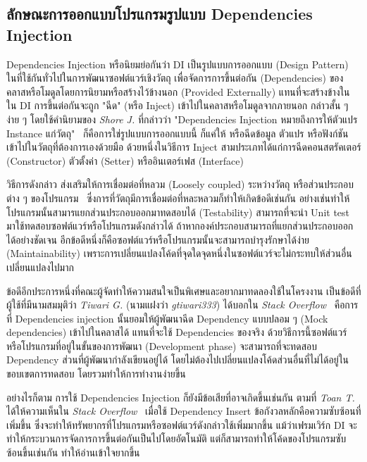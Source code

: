 \documentclass[12pt,one side,openright,a4paper]{cpe-thesis-th}
\newcommand{\thaijustify}[1]{%
  \par\hspace{30pt}\justifying
  #1
}
\begin{document}
\subsection{ลักษณะการออกแบบโปรแกรมรูปแบบ Dependencies Injection}
\thaijustify{
  Dependencies Injection หรือนิยมย่อกันว่า DI เป็นรูปแบบการออกแบบ (Design Pattern) ในที่ใช้กันทั่วไปในการพัฒนาซอฟต์แวร์เชิงวัตถุ เพื่อจัดการการขึ้นต่อกัน (Dependencies) ของคลาสหรือโมดูลโดยการนิยามหรือสร้างไว้ข้างนอก (Provided Externally) แทนที่จะสร้างข้างใน ใน DI การขึ้นต่อกันจะถูก "ฉีด" (หรือ Inject) เข้าไปในคลาสหรือโมดูลจากภายนอก กล่าวสั้น ๆ ง่าย ๆ โดยใช้คำนิยามของ \textit{Shore J.} ที่กล่าวว่า "Dependencies Injection หมายถึงการให้ตัวแปร Instance แก่วัตถุ"~\cite{shore06} ก็คือการใช่รูปแบบการออกแบบนี้ ก็แค่ให้ หรือฉีดข้อมูล ตัวแปร หรือฟังก์ชันเข้าไปในวัตถุที่ต้องการเองด้วยมือ ด้วยหนึ่งในวิธีการ Inject สามประเภทได้แก่การฉีดคอนสตรัคเตอร์ (Constructor) ตัวตั้งค่า (Setter) หรืออินเตอร์เฟส (Interface)
}
\thaijustify{
  วิธีการดังกล่าว ส่งเสริมให้การเชื่อมต่อที่หลวม (Loosely coupled) ระหว่างวัตถุ หรือส่วนประกอบต่าง ๆ ของโปรแกรม~\cite{fowlerDI} ซึ่งการที่วัตถุมีการเชื่อมต่อที่หละหลวมก็ทำให้เกิดข้อดีเช่นกัน อย่างเช่นทำให้โปรแกรมนั้นสามารแยกส่วนประกอบออกมาทดสอบได้ (Testability) สามารถที่จะนำ Unit test มาใช้ทดสอบซอฟต์แวร์หรือโปรแกรมดังกล่าวได้ ถ้าหากองค์ประกอบสามารถที่แยกส่วนประกอบออกได้อย่างชัดเจน อีกข้อดีหนึ่งก็คือซอฟต์แวร์หรือโปรแกรมนั้นจะสามารถบำรุงรักษาได้ง่าย (Maintainability) เพราะการเปลี่ยนแปลงโค้ดที่จุดใดจุดหนึ่งในซอฟต์แวร์จะไม่กระทบให้ส่วนอื่นเปลี่ยนแปลงไปมาก~\cite{freeman09}
}
\thaijustify{
  ข้อดีอีกประการหนึ่งที่คณะผู้จัดทำให้ความสนใจเป็นพิเศษและอยากมาทดลองใช้ในโครงงาน เป็นข้อดีที่ผู้ใช้ที่มีนามสมมุติว่า \textit{Tiwari G.} (นามแฝงว่า \textit{gtiwari333}) ได้บอกใน \textit{Stack Overflow}~\cite{tiwaristackdi} คือการที่ Dependencies injection นั้นยอมให้ผู้พัฒนาฉีด Dependency แบบปลอม ๆ (Mock dependencies) เข้าไปในคลาสได้ แทนที่จะใช้ Dependencies ของจริง ด้วยวิธีการนี้ซอฟต์แวร์หรือโปรแกรมที่อยู่ในขั้นของการพัฒนา (Development phase) จะสามารถที่จะทดสอบ Dependency ส่วนที่ผู้พัฒนากำลังเขียนอยู่ได้ โดยไม่ต้องไปเปลี่ยนแปลงโค้ดส่วนอื่นที่ไม่ได้อยู่ในขอบเขตการทดสอบ โดยรวมทำให้การทำงานง่ายขึ้น
}
\thaijustify{
  อย่างไรก็ตาม การใช้ Dependencies Injection ก็ยังมีข้อเสียที่อาจเกิดขึ้นเช่นกัน ตามที่ \textit{Toan T.} ได้ให้ความเห็นใน \textit{Stack Overflow}~\cite{toanstackdi} เมื่อใช้ Dependency Insert ข้อกังวลหลักคือความซับซ้อนที่เพิ่มขึ้น ซึ่งจะทำให้ทรัพยากรที่โปรแกรมหรือซอฟต์แวร์ดังกล่าวใช้เพิ่มมากขึ้น แม้ว่าเฟรมเวิร์ก DI จะทำให้กระบวนการจัดการการขึ้นต่อกันเป็นไปโดยอัตโนมัติ แต่ก็สามารถทำให้โค้ดของโปรแกรมซับซ้อนขึ้นเช่นกัน ทำให้อ่านเข้าใจยากขึ้น
}
\end{document}
